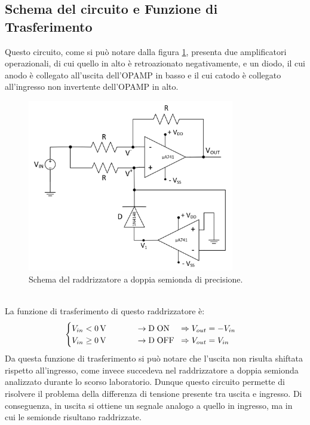 \documentclass{report}
\begin{document}
\subsection{Schema del circuito e Funzione di Trasferimento}
Questo circuito, come si può notare dalla figura \ref{figura:schema1}, presenta due amplificatori operazionali, di cui quello in alto è retroazionato negativamente, e un diodo, il cui anodo è collegato all'uscita dell'OPAMP in basso e il cui catodo è collegato all'ingresso non invertente dell'OPAMP in alto.
\begin{figure}[h]
	\centering
	\includegraphics[height=7.5cm]{immagini/schema1}
	\caption{Schema del raddrizzatore a doppia semionda di precisione.}
	\label{figura:schema1}
\end{figure}
\\ \noindent La funzione di trasferimento di questo raddrizzatore è:
\begin{equation}
   \begin{cases}
   V_{in}< \SI{0}{\volt}\;\;\indent\indent\rightarrow \mathrm{D\;ON}\;\;\;\; \Rightarrow V_{out} = -V_{in}\\
   V_{in}\ge \SI{0}{\volt}\;\;\indent\indent\rightarrow \mathrm{D\; OFF}\;\; \Rightarrow V_{out} = V_{in}
   \end{cases}
\end{equation}
Da questa funzione di trasferimento si può notare che l'uscita non risulta shiftata rispetto all'ingresso, come invece succedeva nel raddrizzatore a doppia semionda analizzato durante lo scorso laboratorio. Dunque questo circuito permette di risolvere il problema della differenza di tensione presente tra uscita e ingresso. Di conseguenza, in uscita si ottiene un segnale analogo a quello in ingresso, ma in cui le semionde risultano raddrizzate.
\end{document}
